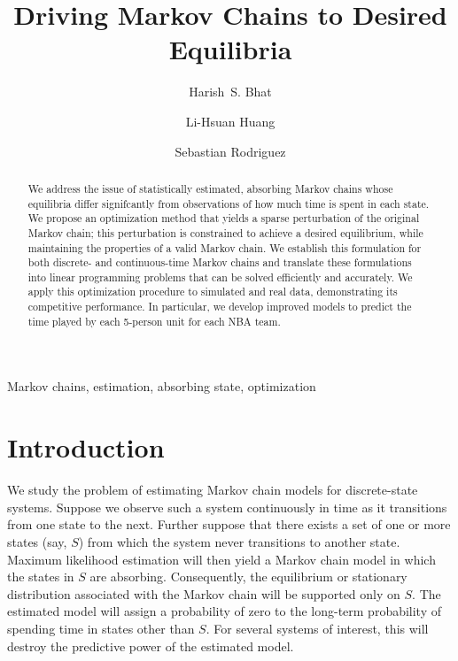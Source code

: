 \documentclass[review,letterpaper,11pt]{elsarticle}
\begin{document}
\begin{frontmatter}

\title{Driving Markov Chains to Desired Equilibria}

\author[ucm,utah]{Harish~S. Bhat}

\author[ucm]{Li-Hsuan Huang}

\author[nw]{Sebastian Rodriguez}


\address[ucm]{Applied Mathematics Unit, University of California, Merced, 5200 North Lake Rd, Merced, CA 95343 USA}
\address[utah]{Department of Mathematics, University of Utah, 155 S 1400 E RM 233, Salt Lake City, UT 84112 USA}
\address[nw]{Department of Statistics, Northwestern University, 2006 Sheridan Rd, Evanston, IL 60208 USA}

\begin{abstract}
We address the issue of statistically estimated, absorbing Markov chains whose equilibria differ signifcantly from observations of how much time is spent in each state.  We propose an optimization method that yields a sparse perturbation of the original Markov chain; this perturbation is constrained to achieve a desired equilibrium, while maintaining the properties of a valid Markov chain.  We establish this formulation for both discrete- and continuous-time Markov chains and translate these formulations into linear programming problems that can be solved efficiently and accurately.  We apply this optimization procedure to simulated and real data, demonstrating its competitive performance. In particular, we develop improved models to predict the time played by each 5-person unit for each NBA team.
\end{abstract}

\begin{keyword}
Markov chains, estimation, absorbing state, optimization
\end{keyword}

\end{frontmatter}

\section{Introduction}
\label{sect:intro}

We study the problem of estimating Markov chain models for discrete-state systems.  Suppose we observe such a system continuously in time as it transitions from one state to the next.  Further suppose that there exists a set of one or more states (say, $S$) from which the system never transitions to another state.  Maximum likelihood estimation will then yield a Markov chain model in which the states in $S$ are absorbing.  Consequently, the equilibrium or stationary distribution associated with the Markov chain will be supported only on $S$.  The estimated model will assign a probability of zero to the long-term probability of spending time in states other than $S$.  For several systems of interest, this will destroy the predictive power of the estimated model.
\end{document}
